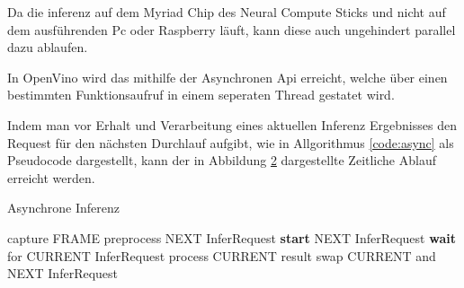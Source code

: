\vspace{1cm}
\begin{figure}[H]
  \centering
  \def\svgwidth{0.9\textwidth}
  
  \caption{}
  \label{fig:sync}
\end{figure}


Da die inferenz auf dem Myriad Chip des Neural Compute Sticks
und nicht auf dem ausführenden Pc oder Raspberry läuft,
kann diese auch ungehindert parallel dazu ablaufen.

In OpenVino wird das mithilfe der Asynchronen Api erreicht, welche 
über einen bestimmten Funktionsaufruf in einem seperaten 
Thread gestatet wird.



Indem man vor Erhalt und Verarbeitung eines aktuellen 
Inferenz Ergebnisses den Request für den nächsten Durchlauf aufgibt, 
wie in Allgorithmus \ref{code:async} als Pseudocode dargestellt, 
kann der in Abbildung \ref{fig:async} dargestellte Zeitliche 
Ablauf erreicht werden.



\vspace{1cm}
\begin{minipage}{0.1\textwidth}
  \hfill
\end{minipage}
\begin{minipage}{0.5\textwidth}
  \begin{algorithm}[H]
    \caption{Asynchrone Inferenz}
    \label{code:async}
    \begin{algorithmic}
    \WHILE{\TRUE}
        \STATE capture FRAME
        \STATE preprocess NEXT InferRequest
        \STATE \textbf{start} NEXT InferRequest
          \STATE \textbf{wait} for CURRENT InferRequest
          \STATE process CURRENT result
          \STATE swap CURRENT and NEXT InferRequest
    \ENDWHILE
    \end{algorithmic}
  \end{algorithm}
\end{minipage}
\begin{minipage}{0.4\textwidth}
  \centering
  \vspace{1cm}
  \def\svgwidth{0.5\textwidth}
  
\end{minipage}

\vspace{1cm}

\begin{figure}[H]
  \centering
  \def\svgwidth{0.9\textwidth}
  
  \caption{}
  \label{fig:async}
\end{figure}

